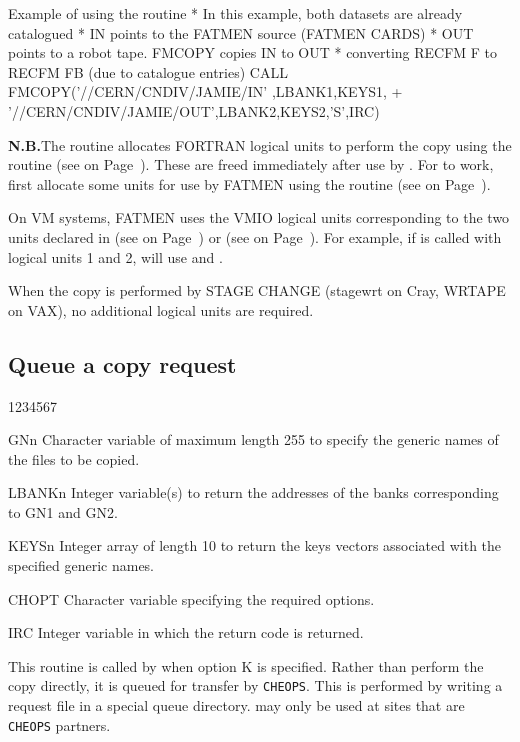 \begin{XMPt}{Example of using the \protect{} routine }
*     In this example, both datasets are already catalogued
*     IN points to the FATMEN source (FATMEN CARDS)
*     OUT points to a robot tape. FMCOPY copies IN to OUT
*     converting RECFM F to RECFM FB (due to catalogue entries)
      CALL FMCOPY('//CERN/CNDIV/JAMIE/IN' ,LBANK1,KEYS1,
     +            '//CERN/CNDIV/JAMIE/OUT',LBANK2,KEYS2,'S',IRC)
\end{XMPt}
{\bf N.B.}The  routine allocates FORTRAN logical units
to perform the copy using the routine  (see
on Page~\pageref{FMGLUN}).
These are freed
immediately after use by . For  to work, first allocate
some units for use by FATMEN using the routine  (see
on Page~\pageref{FMSETU}).
\par
On VM systems, FATMEN uses the VMIO logical units corresponding to
the two units declared in  (see on Page~\pageref{FMSTRT}) or
 (see on Page~\pageref{FMINIT}). For example, if 
is called with logical units 1 and 2,  will use 
and .
\par
When the copy is performed by STAGE CHANGE (stagewrt on Cray,
WRTAPE on VAX), no additional logical units are required.
\subsection{Queue a copy request}
\begin{DLtt}{1234567}
\item[GNn]
Character variable of maximum length 255 to specify the generic names
of the files to be copied.
\item[LBANKn]
Integer variable(s) to return the addresses of the banks
corresponding to GN1 and GN2.
\item[KEYSn]
Integer array of length 10 to return the keys vectors associated
with the specified generic names.
\item[CHOPT]
Character variable specifying the required options.
\item[IRC]
Integer variable in which the return code is returned.
\end{DLtt}

This routine is called by  when option K is specified.
Rather than perform the copy directly, it is queued for transfer
by {\tt CHEOPS}. This is performed by writing a request file
in a special queue directory.  may only be used
at sites that are {\tt CHEOPS} partners.

